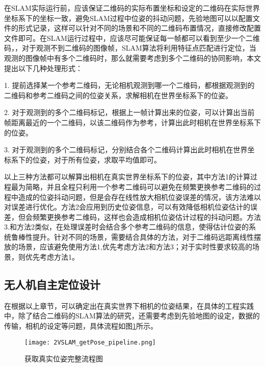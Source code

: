 在SLAM实际运行前，应该保证二维码的实际布置坐标和设定的二维码在实际世界坐标系下的坐标一致，避免SLAM过程中位姿的抖动问题，先验地图可以以配置文件的形式记录，这样可以针对不同的场景和不同的二维码布置情况，直接修改配置文件即可。在SLAM运行过程中，应该尽可能保证每一帧都可以看到至少一个二维码，，对于观测不到二维码的图像帧，SLAM算法将利用特征点匹配进行定位，当观测的图像帧中有多个二维码时，那么就需要考虑到多个二维码的协同影响，本文提出以下几种处理形式：

1. 提前选择某一个参考二维码，无论相机观测到哪一个二维码，都根据观测到的二维码和参考二维码之间的位姿关系，求解相机在世界坐标系下的位姿。

2. 对于观测到的多个二维码标记，根据上一帧计算出来的位姿，可以计算出当前帧距离最近的一个二维码，以该二维码作为参考，计算出此时相机在世界坐标系下的位姿。

3. 对于观测到的多个二维码标记，分别结合各个二维码计算出此时相机在世界坐标系下的位姿，对于所有位姿，求取平均值即可。

以上三种方法都可以解算出相机在真实世界坐标系下的位姿，其中方法1的计算过程最为简略，并且全程只利用一个参考二维码可以避免在频繁更换参考二维码的过程中造成的位姿抖动问题，但是会存在线性放大相机位姿误差的情况，该方法难以对误差进行优化。方法2会应用到历史位姿信息，可以有效降低相机位姿估计的误差，但会频繁更换参考二维码，这样也会造成相机位姿估计过程的抖动问题。方法3.和方法2类似，在处理误差时会结合多个参考二维码的信息，使得估计位姿的系统鲁棒性提升。针对不同的场景，需要结合具体的方法，对于二维码远距离线性摆放的场景，应该避免使用方法1,优先考虑方法2和方法3；对于实时性要求较高的场景，则优先考虑方法1。

\subsection{无人机自主定位设计}
\label{sec:2.4.3}
在根据以上章节，可以确定出在真实世界下相机的位姿结果，在具体的工程实践中，除了结合二维码的SLAM算法的研究，还需要考虑到先验地图的设定，数据的传输，相机的设定等问题，具体流程如图\ref{fig:2VSLAM_getPose_pipeline}所示。
\begin{figure}[t] %
  \centering
  \texttt{[image: 2VSLAM\_getPose\_pipeline.png]}
  \caption{获取真实位姿完整流程图}
  \label{fig:2VSLAM_getPose_pipeline}
\end{figure}

